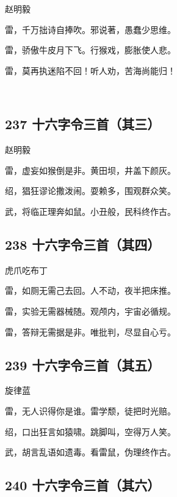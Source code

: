 {赵明毅}

雷，千万拙诗自捧吹。邪说著，愚蠢少思维。

雷，骄傲牛皮月下飞。行猴戏，膨胀使人悲。

雷，莫再执迷陷不回！听人劝，苦海尚能归！

~\\

\hypertarget{ux5341ux516dux5b57ux4ee4ux4e09ux9996ux5176ux4e09}{%
\subsection{237
十六字令三首（其三）}\label{ux5341ux516dux5b57ux4ee4ux4e09ux9996ux5176ux4e09}}

{赵明毅}

雷，虚妄如猴倒是非。黄田坝，井盖下颜灰。

绍，猖狂谬论撒泼闹。耍赖多，围观群众笑。

武，将临正理奔如鼠。小丑般，民科终作古。

\hypertarget{ux5341ux516dux5b57ux4ee4ux4e09ux9996ux5176ux56db}{%
\subsection{238
十六字令三首（其四）}\label{ux5341ux516dux5b57ux4ee4ux4e09ux9996ux5176ux56db}}

{虎爪吃布丁}

雷，如厕无需己去回。人不动，夜半把床推。

雷，实验无需器械随。观颅内，宇宙必循规。

雷，答辩无需据是非。唯批判，尽显自心亏。

\hypertarget{ux5341ux516dux5b57ux4ee4ux4e09ux9996ux5176ux4e94}{%
\subsection{239
十六字令三首（其五）}\label{ux5341ux516dux5b57ux4ee4ux4e09ux9996ux5176ux4e94}}

{旋律蓝}

雷，无人识得你是谁。雷学颓，徒把时光赔。

绍，口出狂言如猿啸。跳脚叫，空得万人笑。

武，胡言乱语如遗毒。看雷鼠，伪理终作古。

\hypertarget{ux5341ux516dux5b57ux4ee4ux4e09ux9996ux5176ux516d}{%
\subsection{240
十六字令三首（其六）}\label{ux5341ux516dux5b57ux4ee4ux4e09ux9996ux5176ux516d}}

